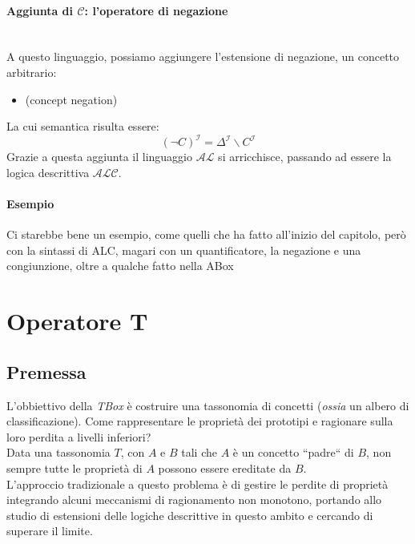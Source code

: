 \paragraph{Aggiunta di $\mathcal{C}$: l’operatore di negazione} \hfill \\
A questo linguaggio, possiamo aggiungere l’estensione di negazione, un concetto arbitrario:
\begin{itemize}
	\item[]  (concept negation)
\end{itemize}
La cui semantica risulta essere:
\[ (\neg C)^{\mathcal{I}} =  \Delta^{\mathcal{I}}\backslash C^{\mathcal{I}}\]
Grazie a questa aggiunta il linguaggio $ \mathcal{AL} $ si arricchisce, 
passando ad essere la logica descrittiva $ \mathcal{ALC} $.

\paragraph{Esempio} \hfill

Ci starebbe bene un esempio, come quelli che ha fatto all'inizio del capitolo, però con la sintassi di ALC, magari con un quantificatore, la negazione e una congiunzione, oltre a qualche fatto nella ABox

\section{Operatore T}
\subsection{Premessa}
L'obbiettivo della \textit{TBox} è costruire una tassonomia di concetti (\textit{ossia} un albero di classificazione). 
Come rappresentare le proprietà dei prototipi e ragionare sulla loro perdita a livelli inferiori? \\
Data una tassonomia $T$, con $A$ e $B$ tali che $A$ è un concetto “padre“ di $B$, 
non sempre tutte le proprietà di $A$ possono essere ereditate da $B$.\\
L’approccio tradizionale a questo problema è di gestire le perdite di proprietà 
integrando alcuni meccanismi di ragionamento non monotono, portando allo studio di estensioni 
delle logiche descrittive in questo ambito e cercando di superare il limite.
